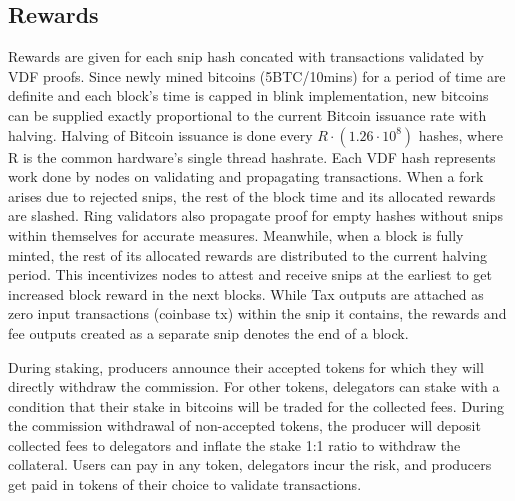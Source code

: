 \documentclass[../Bitcoin Blink.tex]{subfiles}
\begin{document}
\subsection{Rewards}
Rewards are given for each snip hash concated with transactions validated by VDF proofs. Since newly mined bitcoins (5BTC/10mins) for a period of time are definite and each block's time is capped in blink implementation, new bitcoins can be supplied exactly proportional to the current Bitcoin issuance rate with halving. Halving of Bitcoin issuance is done every $R \cdot (1.26 \cdot 10^8)$ hashes, where R is the common hardware's single thread hashrate. Each VDF hash represents work done by nodes on validating and propagating transactions. When a fork arises due to rejected snips, the rest of the block time and its allocated rewards are slashed. Ring validators also propagate proof for empty hashes without snips within themselves for accurate measures. Meanwhile, when a block is fully minted, the rest of its allocated rewards are distributed to the current halving period. This incentivizes nodes to attest and receive snips at the earliest to get increased block reward in the next blocks. While Tax outputs are attached as zero input transactions (coinbase tx) within the snip it contains, the rewards and fee outputs created as a separate snip denotes the end of a block.

During staking, producers announce their accepted tokens for which they will directly withdraw the commission. For other tokens, delegators can stake with a condition that their stake in bitcoins will be traded for the collected fees. During the commission withdrawal of non-accepted tokens, the producer will deposit collected fees to delegators and inflate the stake 1:1 ratio to withdraw the collateral. Users can pay in any token, delegators incur the risk, and producers get paid in tokens of their choice to validate transactions.
\end{document}
